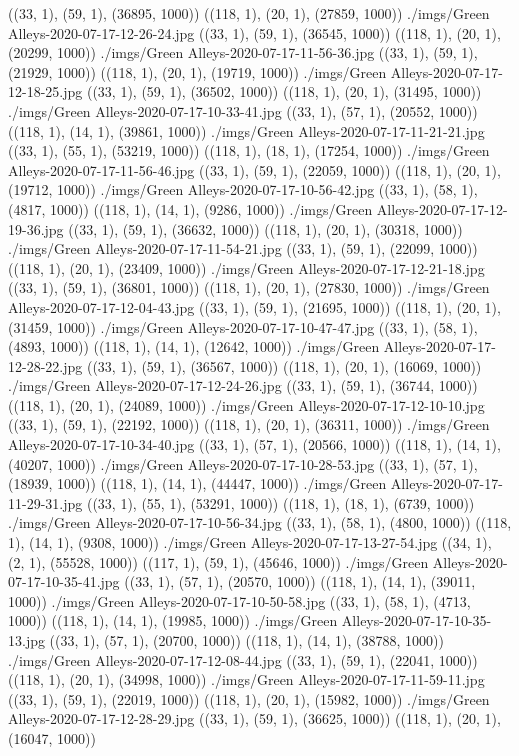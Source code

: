 ((33, 1), (59, 1), (36895, 1000))
((118, 1), (20, 1), (27859, 1000))
./imgs/Green Alleys-2020-07-17-12-26-24.jpg
((33, 1), (59, 1), (36545, 1000))
((118, 1), (20, 1), (20299, 1000))
./imgs/Green Alleys-2020-07-17-11-56-36.jpg
((33, 1), (59, 1), (21929, 1000))
((118, 1), (20, 1), (19719, 1000))
./imgs/Green Alleys-2020-07-17-12-18-25.jpg
((33, 1), (59, 1), (36502, 1000))
((118, 1), (20, 1), (31495, 1000))
./imgs/Green Alleys-2020-07-17-10-33-41.jpg
((33, 1), (57, 1), (20552, 1000))
((118, 1), (14, 1), (39861, 1000))
./imgs/Green Alleys-2020-07-17-11-21-21.jpg
((33, 1), (55, 1), (53219, 1000))
((118, 1), (18, 1), (17254, 1000))
./imgs/Green Alleys-2020-07-17-11-56-46.jpg
((33, 1), (59, 1), (22059, 1000))
((118, 1), (20, 1), (19712, 1000))
./imgs/Green Alleys-2020-07-17-10-56-42.jpg
((33, 1), (58, 1), (4817, 1000))
((118, 1), (14, 1), (9286, 1000))
./imgs/Green Alleys-2020-07-17-12-19-36.jpg
((33, 1), (59, 1), (36632, 1000))
((118, 1), (20, 1), (30318, 1000))
./imgs/Green Alleys-2020-07-17-11-54-21.jpg
((33, 1), (59, 1), (22099, 1000))
((118, 1), (20, 1), (23409, 1000))
./imgs/Green Alleys-2020-07-17-12-21-18.jpg
((33, 1), (59, 1), (36801, 1000))
((118, 1), (20, 1), (27830, 1000))
./imgs/Green Alleys-2020-07-17-12-04-43.jpg
((33, 1), (59, 1), (21695, 1000))
((118, 1), (20, 1), (31459, 1000))
./imgs/Green Alleys-2020-07-17-10-47-47.jpg
((33, 1), (58, 1), (4893, 1000))
((118, 1), (14, 1), (12642, 1000))
./imgs/Green Alleys-2020-07-17-12-28-22.jpg
((33, 1), (59, 1), (36567, 1000))
((118, 1), (20, 1), (16069, 1000))
./imgs/Green Alleys-2020-07-17-12-24-26.jpg
((33, 1), (59, 1), (36744, 1000))
((118, 1), (20, 1), (24089, 1000))
./imgs/Green Alleys-2020-07-17-12-10-10.jpg
((33, 1), (59, 1), (22192, 1000))
((118, 1), (20, 1), (36311, 1000))
./imgs/Green Alleys-2020-07-17-10-34-40.jpg
((33, 1), (57, 1), (20566, 1000))
((118, 1), (14, 1), (40207, 1000))
./imgs/Green Alleys-2020-07-17-10-28-53.jpg
((33, 1), (57, 1), (18939, 1000))
((118, 1), (14, 1), (44447, 1000))
./imgs/Green Alleys-2020-07-17-11-29-31.jpg
((33, 1), (55, 1), (53291, 1000))
((118, 1), (18, 1), (6739, 1000))
./imgs/Green Alleys-2020-07-17-10-56-34.jpg
((33, 1), (58, 1), (4800, 1000))
((118, 1), (14, 1), (9308, 1000))
./imgs/Green Alleys-2020-07-17-13-27-54.jpg
((34, 1), (2, 1), (55528, 1000))
((117, 1), (59, 1), (45646, 1000))
./imgs/Green Alleys-2020-07-17-10-35-41.jpg
((33, 1), (57, 1), (20570, 1000))
((118, 1), (14, 1), (39011, 1000))
./imgs/Green Alleys-2020-07-17-10-50-58.jpg
((33, 1), (58, 1), (4713, 1000))
((118, 1), (14, 1), (19985, 1000))
./imgs/Green Alleys-2020-07-17-10-35-13.jpg
((33, 1), (57, 1), (20700, 1000))
((118, 1), (14, 1), (38788, 1000))
./imgs/Green Alleys-2020-07-17-12-08-44.jpg
((33, 1), (59, 1), (22041, 1000))
((118, 1), (20, 1), (34998, 1000))
./imgs/Green Alleys-2020-07-17-11-59-11.jpg
((33, 1), (59, 1), (22019, 1000))
((118, 1), (20, 1), (15982, 1000))
./imgs/Green Alleys-2020-07-17-12-28-29.jpg
((33, 1), (59, 1), (36625, 1000))
((118, 1), (20, 1), (16047, 1000))

